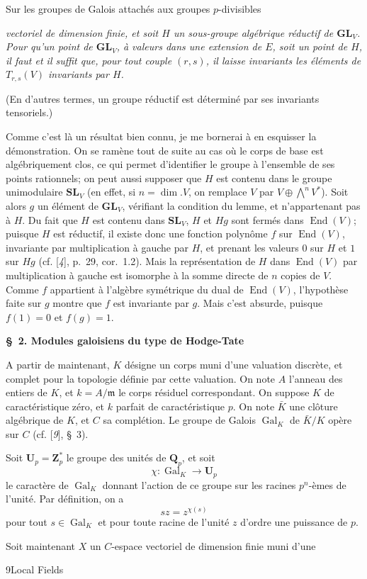 \begin{center}\small Sur les groupes de Galois attachés aux groupes $p$-divisibles\end{center}
\textit{vectoriel de dimension finie, et soit $H$ un sous-groupe algébrique réductif de $\mathbf{GL}_V$. Pour qu’un point de $\mathbf{GL}_V$, à valeurs dans une extension de $E$, soit un point de $H$, il faut et il suffit que, pour tout couple $(r,s)$, il laisse invariants les éléments de $T_{r,s}(V)$ invariants par $H$.}

(En d’autres termes, un groupe réductif est déterminé par ses invariants tensoriels.)

Comme c’est là un résultat bien connu, je me bornerai à en esquisser la démonstration. On se ramène tout de suite au cas où le corps de base est algébriquement clos, ce qui permet d’identifier le groupe à l’ensemble de ses points rationnels; on peut aussi supposer que $H$ est contenu dans le groupe unimodulaire $\mathbf{SL}_V$ (en effet, si $n=\dim. V$, on remplace $V$ par $V\oplus\bigwedge^n V^*$). Soit alors $g$ un élément de $\mathbf{GL}_V$, vérifiant la condition du lemme, et n’appartenant pas à $H$. Du fait que $H$ est contenu dans $\mathbf{SL}_V$, $H$ et $Hg$ sont fermés dans $\operatorname{End}(V)$; puisque $H$ est réductif, il existe donc une fonction polynôme $f$ sur $\operatorname{End}(V)$, invariante par multiplication à gauche par $H$, et prenant les valeurs $0$ sur $H$ et $1$ sur $Hg$ (cf. [\textit{4}], p.~29, cor.~1.2). Mais la représentation de $H$ dans $\operatorname{End}(V)$ par multiplication à gauche est isomorphe à la somme directe de $n$ copies de $V$. Comme $f$ appartient à l’algèbre symétrique du dual de $\operatorname{End}(V)$, l’hypothèse faite sur $g$ montre que $f$ est invariante par $g$. Mais c’est absurde, puisque $f(1)=0$ et $f(g)=1$.

\begin{center}\textbf{\S~2. Modules galoisiens du type de Hodge-Tate}\end{center}

A partir de maintenant, $K$ désigne un corps muni d’une valuation discrète, et complet pour la topologie définie par cette valuation. On note $A$ l’anneau des entiers de $K$, et $k=A/\mathfrak{m}$ le corps résiduel correspondant. On suppose $K$ de caractéristique zéro, et $k$ parfait de caractéristique $p$. On note $\bar K$ une clôture algébrique de $K$, et $C$ sa complétion. Le groupe de Galois $\operatorname{Gal}_K$ de $\bar K/K$ opère sur $C$ (cf. [\textit{9}], \S~3).

Soit $\mathbf{U}_p=\mathbf{Z}_p^*$ le groupe des unités de $\mathbf{Q}_p$, et soit
\[
\chi:\operatorname{Gal}_K\to\mathbf{U}_p
\]
le caractère de $\operatorname{Gal}_K$ donnant l’action de ce groupe sur les racines $p^n$-èmes de l’unité. Par définition, on a
\[
sz=z^{\chi(s)}
\]
pour tout $s\in\operatorname{Gal}_K$ et pour toute racine de l’unité $z$ d’ordre une puissance de $p$.

Soit maintenant $X$ un $C$-espace vectoriel de dimension finie muni d’une

{\footnotesize 9\qquad Local Fields\par}
